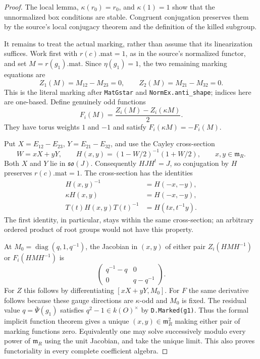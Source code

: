 \begin{proof}
The local lemma, $\kappa(r_0)=r_0$, and $\kappa(1)=1$ show that
the unnormalized box conditions are stable.  Congruent
conjugation preserves them by the source's local conjugacy
theorem and the definition of the killed subgroup.

It remains to treat the actual marking, rather than assume
that its linearization suffices.  Work first with
$r(c).\mathrm{mat}=1$, as in the source's normalized functor,
and set $M=r(g_1).\mathrm{mat}$.  Since $\eta(g_1)=1$, the two
remaining marking equations are
\[
 Z_1(M)=M_{12}-M_{23}=0,\qquad
 Z_2(M)=M_{21}-M_{32}=0.                                    \tag{KP.8}
\]
This is the literal marking after
\texttt{MatGstar} and \texttt{NormEx.anti\_shape}; indices here
are one-based.  Define genuinely odd functions
\[
           F_i(M)=\frac{Z_i(M)-Z_i(\kappa M)}2.              \tag{KP.9}
\]
They have torus weights $1$ and $-1$ and satisfy
$F_i(\kappa M)=-F_i(M)$.

Put $X=E_{12}-E_{23}$, $Y=E_{21}-E_{32}$, and use the Cayley
cross-section
\[
 W=xX+yY,\qquad
 H(x,y)=(1-W/2)^{-1}(1+W/2),\qquad x,y\in\mathfrak m_R.
                                                                  \tag{KP.10}
\]
Both $X$ and $Y$ lie in $\mathfrak{so}(J)$.
Consequently $H J H^t=J$, so conjugation by $H$ preserves
$r(c).\mathrm{mat}=1$.  The cross-section has the identities
\[
 \begin{split}
 H(x,y)^{-1}&=H(-x,-y),\\
 \kappa H(x,y)&=H(-x,-y),\\
 T(t)H(x,y)T(t)^{-1}&=H(tx,t^{-1}y).
 \end{split}                                                    \tag{KP.11}
\]
The first identity, in particular, stays within the same
cross-section; an arbitrary ordered product of root groups
would not have this property.

At $M_0=\operatorname{diag}(q,1,q^{-1})$, the Jacobian in
$(x,y)$ of either pair
$Z_i(HMH^{-1})$ or $F_i(HMH^{-1})$ is
\[
               \begin{pmatrix}q^{-1}-q&0\\0&q-q^{-1}\end{pmatrix}.
                                                                  \tag{KP.12}
\]
For $Z$ this follows by differentiating $[xX+yY,M_0]$.
For $F$ the same derivative follows because these gauge
directions are $\kappa$-odd and $M_0$ is fixed.  The residual
value $q=\bar\Psi(g_1)$ satisfies $q^2-1\in k(O)^\times$
by \texttt{D.Marked(g1)}.  Thus the formal implicit function
theorem gives a unique $(x,y)\in\mathfrak m_R^2$ making either
pair of marking functions zero.  Equivalently one may solve
successively modulo every power of $\mathfrak m_R$ using the
unit Jacobian, and take the unique limit.  This also proves
functoriality in every complete coefficient algebra.


\end{proof}
